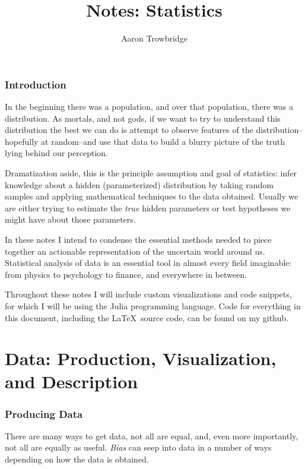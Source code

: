 \documentclass{article}
\title{Notes: Statistics}
\author{Aaron Trowbridge}
\date{}
\begin{document}
\maketitle

\tableofcontents
\newpage




\section{Introduction}

In the beginning there was a population, and over that population, there was a distribution.  As mortals, and not gods, if we want to try to understand this distribution the best we can do is attempt to observe features of the distribution--hopefully at random--and use that data to build a blurry picture of the truth lying behind our perception.  

Dramatization aside, this is the principle assumption and goal of statistics: infer knowledge about a hidden (parameterized) distribution by taking random samples and applying mathematical techniques to the data obtained. Usually we are either trying to estimate the \textit{true} hidden parameters or test hypotheses we might have about those parameters. 

In these notes I intend to condense the essential methods needed to piece together an actionable representation of the uncertain world around us.  Statistical analysis of data is an essential tool in almost every field imaginable: from physics to psychology to finance, and everywhere in between.

Throughout these notes I will include custom visualizations and code snippets, for which I will be using the Julia programming language.  Code for everything in this document, including the \LaTeX \  source code, can be found on my github. 

\newpage
\part{Data: Production, Visualization, and Description}
\section{Producing Data}

There are many ways to get data, not all are equal, and, even more importantly, not all are equally as useful. \textit{Bias} can seep into data in a number of ways depending on how the data is obtained. 
\end{document}

